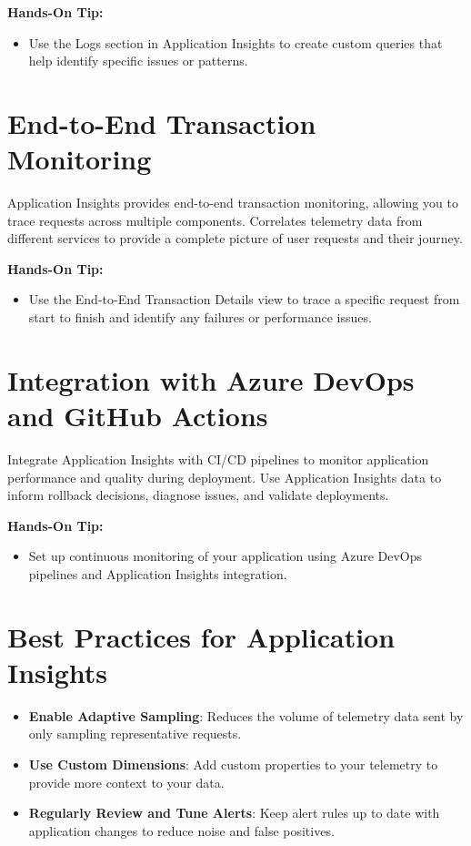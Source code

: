 \documentclass{article}
\begin{document}
\textbf{Hands-On Tip:}
\begin{itemize}
    \item Use the Logs section in Application Insights to create custom queries that help identify specific issues or patterns.
\end{itemize}

\section{End-to-End Transaction Monitoring}
Application Insights provides end-to-end transaction monitoring, allowing you to trace requests across multiple components. Correlates telemetry data from different services to provide a complete picture of user requests and their journey.

\textbf{Hands-On Tip:}
\begin{itemize}
    \item Use the End-to-End Transaction Details view to trace a specific request from start to finish and identify any failures or performance issues.
\end{itemize}

\section{Integration with Azure DevOps and GitHub Actions}
Integrate Application Insights with CI/CD pipelines to monitor application performance and quality during deployment. Use Application Insights data to inform rollback decisions, diagnose issues, and validate deployments.

\textbf{Hands-On Tip:}
\begin{itemize}
    \item Set up continuous monitoring of your application using Azure DevOps pipelines and Application Insights integration.
\end{itemize}

\section{Best Practices for Application Insights}
\begin{itemize}
    \item \textbf{Enable Adaptive Sampling}: Reduces the volume of telemetry data sent by only sampling representative requests.
    \item \textbf{Use Custom Dimensions}: Add custom properties to your telemetry to provide more context to your data.
    \item \textbf{Regularly Review and Tune Alerts}: Keep alert rules up to date with application changes to reduce noise and false positives.
\end{itemize}
\end{document}
